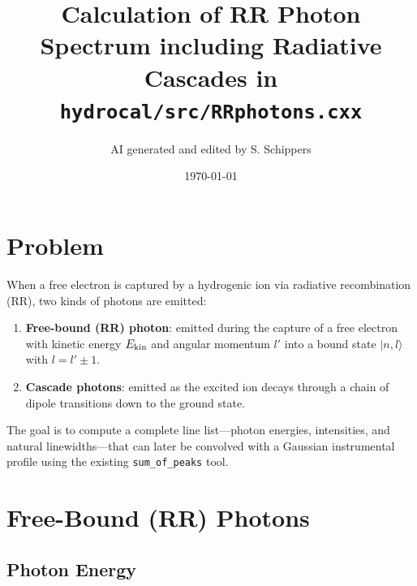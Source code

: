 \documentclass[11pt,a4paper]{article}
\begin{document}
\title{Calculation of RR Photon Spectrum including Radiative Cascades in \texttt{hydrocal/src/RRphotons.cxx}}
\author{AI generated and edited by S. Schippers}
\date{\today}
\maketitle

\section{Problem}

When a free electron is captured by a hydrogenic ion via radiative
recombination (RR), two kinds of photons are emitted:
\begin{enumerate}
\item \textbf{Free-bound (RR) photon}: emitted during the capture of
  a free electron with kinetic energy $E_{\rm kin}$ and angular
  momentum $l'$ into a bound state $|n,l\rangle$ with
  $l = l' \pm 1$.
\item \textbf{Cascade photons}: emitted as the excited ion decays
  through a chain of dipole transitions down to the ground state.
\end{enumerate}
The goal is to compute a complete line list---photon energies,
intensities, and natural linewidths---that can later be convolved with
a Gaussian instrumental profile using the existing \texttt{sum\_of\_peaks}
tool.

\section{Free-Bound (RR) Photons}

\subsection{Photon Energy}
\end{document}
